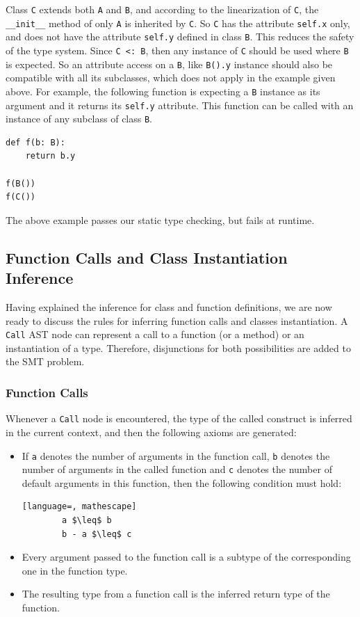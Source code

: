 Class \lstinline|C| extends both \lstinline|A| and \lstinline|B|, and according to the linearization of \lstinline|C|, the \lstinline|__init__| method of only \lstinline|A| is inherited by \lstinline|C|. So \lstinline|C| has the attribute \lstinline|self.x| only, and does not have the attribute \lstinline|self.y| defined in class \lstinline|B|. This reduces the safety of the type system. Since \lstinline|C <: B|, then any instance of \lstinline|C| should be used where \lstinline|B| is expected. So an attribute access on a \lstinline|B|, like \lstinline|B().y| instance should also be compatible with all its subclasses, which does not apply in the example given above. For example, the following function is expecting a \lstinline|B| instance as its argument and it returns its \lstinline|self.y| attribute. This function can be called with an instance of any subclass of class \lstinline|B|.
\begin{lstlisting}
def f(b: B):
	return b.y
	
f(B())
f(C()) 
\end{lstlisting}

The above example passes our static type checking, but fails at runtime.
\subsection{Function Calls and Class Instantiation Inference}
Having explained the inference for class and function definitions, we are now ready to discuss the rules for inferring function calls and classes instantiation. A \lstinline|Call| AST node can represent a call to a function (or a method) or an instantiation of a type. Therefore, disjunctions for both possibilities are added to the SMT problem.

\subsubsection{Function Calls}
Whenever a \lstinline|Call| node is encountered, the type of the called construct is inferred in the current context, and then the following axioms are generated:
\begin{itemize}
	\item If \lstinline|a| denotes the number of arguments in the function call, \lstinline|b| denotes the number of arguments in the called function and \lstinline|c| denotes the number of default arguments in this function, then the following condition must hold:
	\begin{lstlisting}[language=, mathescape]
		a $\leq$ b
		b - a $\leq$ c
	\end{lstlisting}
	
	\item Every argument passed to the function call is a subtype of the corresponding one in the function type.
	
	\item The resulting type from a function call is the inferred return type of the function.
\end{itemize}

